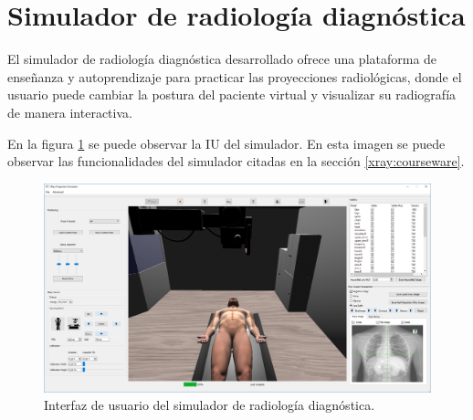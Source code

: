 \section{Simulador de radiología diagnóstica}
\label{result:xray}

El simulador de radiología diagnóstica desarrollado ofrece una plataforma de enseñanza y autoprendizaje para practicar las proyecciones radiológicas, donde el usuario puede cambiar la postura del paciente virtual y visualizar su radiografía de manera interactiva. 

En la figura \ref{fig:simui} se puede observar la \ac{IU} del simulador. En esta imagen se puede observar las funcionalidades del simulador citadas en la sección \ref{xray:courseware}. 
\begin{figure}[h]
\centering
\includegraphics[width=0.95\linewidth]{IMG/simui.png}
\caption{\label{fig:simui} Interfaz de usuario del simulador de radiología diagnóstica. }
\end{figure}


